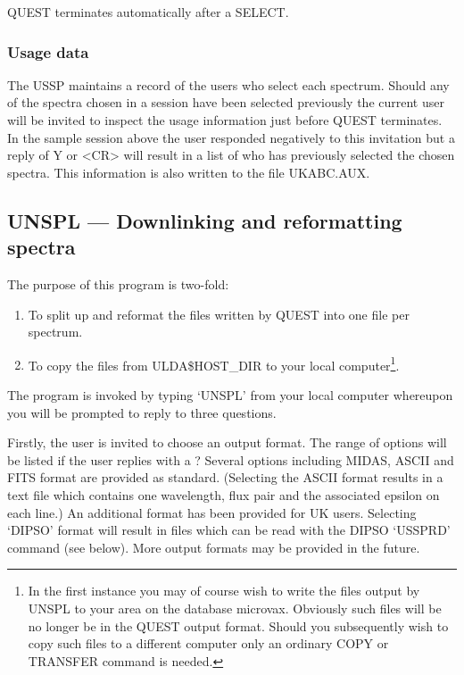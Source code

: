 QUEST terminates automatically after a SELECT.

\subsubsection {Usage data}

The USSP maintains a record of the users who select each spectrum.
Should any of the spectra chosen in a session have been selected previously
the current user will be invited to inspect the usage information just before
QUEST terminates.
In the sample session above the user responded negatively to this
invitation but a reply of Y or <CR> will result
in a list of who has previously selected the chosen spectra.
This information is also written to the file UKABC.AUX.


\subsection{UNSPL --- Downlinking and reformatting spectra}

The purpose of this program is two-fold:
\begin{enumerate}
\item To split up and reformat the  files written by QUEST into
one file per spectrum.

\item To copy the files from ULDA\$HOST\_DIR to your local
computer\footnote{In the first instance you may of course wish to write the files output by UNSPL
to your area on the database microvax.
Obviously such files will be no longer be in the QUEST output format.
Should you subsequently wish to copy such files to a different computer only
an ordinary COPY or TRANSFER command is needed.}.
\end{enumerate}

The program is invoked by typing `UNSPL' from your local computer whereupon
you will be prompted to reply to three questions.

Firstly, the user is invited to choose an output format.
The range of options will be listed if the user replies with a ?
Several options including MIDAS, ASCII and FITS format are provided as standard.
(Selecting the ASCII format results in a text file which contains one
wavelength,
flux pair and the associated epsilon on each line.)
An additional format has been provided for UK users.
Selecting `DIPSO' format will result in files which can be read with the DIPSO
`USSPRD' command (see below).
More output formats may be provided in the future.

